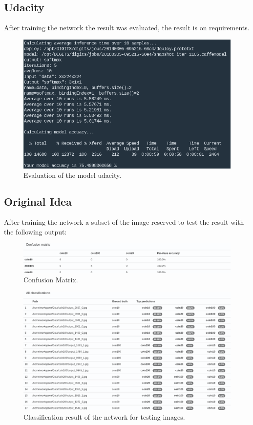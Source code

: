 \documentclass[10pt,journal,compsoc]{IEEEtran}
\begin{document}
\subsection{Udacity}

After training the network the result was evaluated, the result is on requirements.

\begin{figure}[h]
\centering
\includegraphics[scale=0.2]{udacity-evaluate}
\caption{Evaluation of the model udacity.}
\label{fig:figure4}
\end{figure}

\subsection{Original Idea}

After training the network a subset of the image reserved to test the result with the following output:

\begin{figure}[h]
\centering
\includegraphics[scale=0.2]{confusion-matrix}
\caption{Confusion Matrix.}
\label{fig:figure5}
\end{figure}


\begin{figure}[h]
\centering
\includegraphics[scale=0.2]{classification-all}
\caption{Classification result of the network for testing images.}
\label{fig:figure6}
\end{figure}
\end{document}
